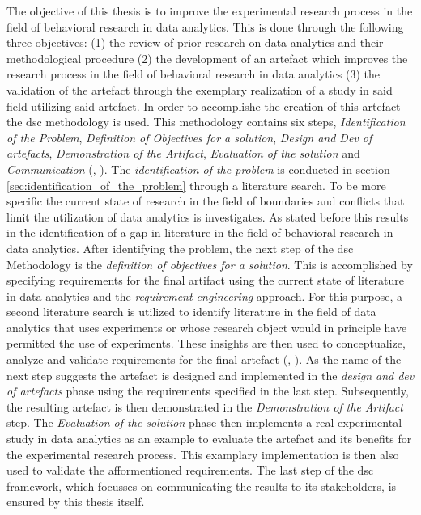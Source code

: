 The objective of this thesis is to improve the experimental research process in the field of behavioral research in data analytics. This is done through the following three objectives: (1) the review of prior research on data analytics and their methodological procedure (2) the development of an artefact which improves the research process in the field of behavioral research in data analytics (3) the validation of the artefact through the exemplary realization of a study in said field utilizing said artefact. In order to accomplishe the creation of this artefact the \ac{dsc} methodology is used. This methodology contains six steps, \textit{Identification of the Problem}, \textit{Definition of Objectives for a solution}, \textit{Design and Dev of artefacts}, \textit{Demonstration of the Artifact}, \textit{Evaluation of the solution} and \textit{Communication} (\cite{Peffers.2006}, \cite{Dresch.2015}). 
The \textit{identification of the problem} is conducted in section \ref{sec:identification_of_the_problem} through a literature search. To be more specific the current state of research in the field of boundaries and conflicts that limit the utilization of data analytics is investigates. As stated before this results in the identification of a gap in literature in the field of behavioral research in data analytics. After identifying the problem, the next step of the \ac{dsc} Methodology is the \textit{definition of objectives for a solution}. This is accomplished by specifying requirements for the final artifact using the current state of literature in data analytics and the \textit{requirement engineering} approach. For this purpose, a second literature search is utilized to identify literature in the field of data analytics that uses experiments or whose research object would in principle have permitted the use of experiments. These insights are then used to conceptualize, analyze and validate requirements for the final artefact (\cite{Sommerville.2011}, \cite{SWEBOK.2004}). %
As the name of the next step suggests the artefact is designed and implemented in the \textit{design and dev of artefacts} phase using the requirements specified in the last step. Subsequently, the resulting artefact is then demonstrated in the \textit{Demonstration of the Artifact} step. The \textit{Evaluation of the solution} phase then implements a real experimental study in data analytics as an example to evaluate the artefact and its benefits for the experimental research process. This examplary implementation is then also used to validate the afformentioned requirements. The last step of the \ac{dsc} framework, which focusses on communicating the results to its stakeholders, is ensured by this thesis itself. 

